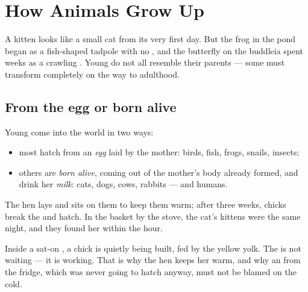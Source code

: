 \chapter{How Animals Grow Up}\label{ch:g2:animals-grow-up}

A kitten looks like a small cat from its very first day. But the
frog in the pond began as a fish-shaped tadpole with no , and
the butterfly on the buddleia spent weeks as a crawling
. Young  do not all resemble their parents ---
some must transform completely on the way to adulthood.

\section{From the egg or born alive}

\begin{definition}\label{def:g2:animals-grow-up:born}
Young  come into the world in two ways:
\begin{itemize}
  \item most hatch from an \emph{egg} laid by the
        mother: birds, fish, frogs, snails, insects;
  \item others are \emph{born alive}, coming out
        of the mother's body already formed, and drink her
        \emph{milk}: cats, dogs, cows, rabbits --- and
        humans.
\end{itemize}
\end{definition}

\begin{example}\label{ex:g2:animals-grow-up:henhouse}
The hen lays  and sits on them to keep them warm; after three
weeks, chicks break the  and hatch. In the basket by the
stove, the cat's kittens were  the same night, and they
found her  within the hour.
\end{example}

\begin{remark}\label{rem:g2:animals-grow-up:egg}
Inside a sat-on , a chick is quietly being built, fed by the
yellow yolk. The  is not waiting --- it is working. That is why
the hen keeps her  warm, and why an  from the fridge, which
was never going to hatch anyway, must not be blamed on the cold.
\end{remark}

